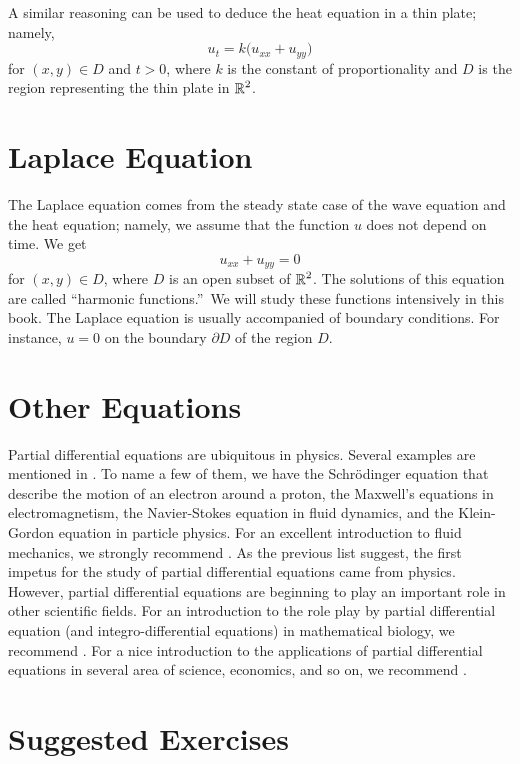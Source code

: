 A similar reasoning can be used to deduce the heat equation in a thin
plate; namely,
\[
u_t = k \big( u_{xx} + u_{yy} \big)
\]
for $(x,y) \in D$ and $t > 0$, where $k$ is the constant of
proportionality and $D$ is the region representing the thin plate in
$\displaystyle \mathbb{R}^2$.

\section*{Laplace Equation}

The Laplace equation comes from the steady state case of the wave
equation and the heat equation; namely, we assume that the function
$u$ does not depend on time.  We get
\[
  u_{xx} + u_{yy} = 0
\]
for $(x,y) \in D$, where $D$ is an open subset of
$\displaystyle \mathbb{R}^2$.  The solutions of this
equation are called ``harmonic functions.''\  We will study these
functions intensively in this book.  The Laplace equation is usually
accompanied of boundary conditions.  For instance, $u=0$ on the
boundary $\partial D$ of the region $D$.

\section*{Other Equations}

Partial differential equations are ubiquitous in physics.  Several
examples are mentioned in \cite{Str}.  To name a few of them, we have
the Schrödinger equation that describe the motion of an electron
around a proton, the Maxwell's equations in electromagnetism, the
Navier-Stokes equation in fluid dynamics, and the Klein-Gordon
equation in particle physics.   For an excellent introduction to fluid
mechanics, we strongly recommend \cite{ChMa}.  As the previous list
suggest, the first impetus for the study of partial differential
equations came from physics.  However, partial differential equations are
beginning to play an important role in other scientific fields.  For an
introduction to the role play by partial differential equation (and
integro-differential equations) in mathematical biology, we recommend
\cite{Ho}.  For a nice introduction to the applications of partial
differential equations in several area of science, economics, and so
on, we recommend \cite{Sal}.

\section*{Suggested Exercises}

